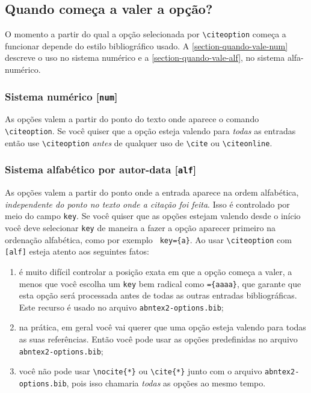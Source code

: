 \documentclass[a4paper]{ltxdoc}
\begin{document}
\subsection{Quando começa a valer a opção?}
\label{section-quando-vale}

O momento a partir do qual a opção selecionada por \verb+\citeoption+
começa a funcionar depende do estilo bibliográfico usado. A
\autoref{section-quando-vale-num} descreve o uso no sistema numérico e a
\autoref{section-quando-vale-alf}, no sistema alfa-numérico.

\subsubsection{Sistema numérico [\texttt{num}]}\label{section-quando-vale-num}

As opções valem a partir do ponto do texto onde aparece o comando
\verb+\citeoption+. Se você quiser que a opção esteja valendo para \emph{todas}
as entradas então use \verb+\citeoption+ \emph{antes} de qualquer uso de
\verb+\cite+ ou \verb+\citeonline+.

\subsubsection{Sistema alfabético por autor-data [\texttt{alf}]}
\label{section-quando-vale-alf}

As opções valem a partir do ponto onde a entrada aparece na ordem alfabética,
\emph{independente do ponto no texto onde a citação foi feita}. Isso é
controlado por meio do campo \texttt{key}. Se você quiser que as opções estejam
valendo desde o início você deve selecionar \texttt{key} de maneira a fazer a
opção aparecer primeiro na ordenação alfabética, como por exemplo \texttt{
key=\{a\}}. Ao usar \verb+\citeoption+ com \texttt{[alf]} esteja atento aos
seguintes fatos:

\begin{enumerate}
\item é muito difícil controlar a posição exata em que a opção
      começa a valer, a menos que você escolha um \texttt{key} bem
      radical como \texttt{=\{aaaa\}}, que garante que esta opção será
      processada antes de todas as outras entradas bibliográficas.
      Este recurso é usado no arquivo \texttt{abntex2-options.bib};
\item na prática, em geral você vai querer que uma opção esteja
      valendo para todas as suas referências. Então você pode usar
      as opções predefinidas no arquivo \texttt{abntex2-options.bib};
\item você não pode usar \verb+\nocite{*}+ ou \verb+\cite{*}+
      junto com o arquivo
      \texttt{abntex2-options.bib}, pois isso chamaria \emph{todas} as
      opções ao mesmo tempo.
\end{enumerate}
\end{document}

